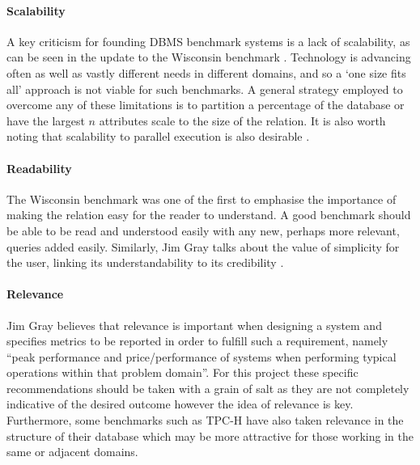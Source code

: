 \paragraph{Scalability} A key criticism for founding DBMS benchmark systems is a
lack of scalability, as can be seen in the update to the Wisconsin benchmark
\cite{Wisconsin2}. Technology is advancing often as well as vastly different
needs in different domains, and so a `one size fits all' approach is not viable
for such benchmarks. A general strategy employed to overcome any of these
limitations is to partition a percentage of the database or have the largest $n$
attributes scale to the size of the relation. It is also worth noting that
scalability to parallel execution is also desirable \cite{BenchmarkHandbook}.

\paragraph{Readability} The Wisconsin benchmark \cite{Wisconsin} was one of the
first to emphasise the importance of making the relation easy for the reader to
understand. A good benchmark should be able to be read and understood easily
with any new, perhaps more relevant, queries added easily. Similarly, Jim Gray
talks about the value of simplicity for the user, linking its understandability
to its credibility \cite{BenchmarkHandbook}.

\paragraph{Relevance} Jim Gray believes that relevance is important when
designing a system and specifies metrics to be reported in order to fulfill such
a requirement, namely ``peak performance and price/performance of systems when
performing typical operations within that problem domain''. For this project
these specific recommendations should be taken with a grain of salt as they are
not completely indicative of the desired outcome however the idea of relevance
is key. Furthermore, some benchmarks such as TPC-H \cite{TPC-H} have also taken
relevance in the structure of their database which may be more attractive for
those working in the same or adjacent domains.
